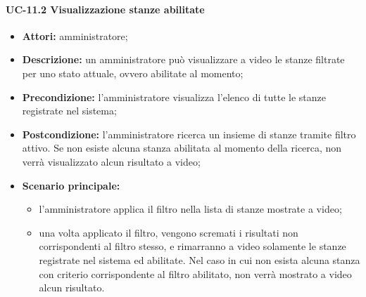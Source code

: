 \paragraph{UC-11.2 Visualizzazione stanze abilitate}
\begin{itemize}
    \item \textbf{Attori:} amministratore;
    \item \textbf{Descrizione:} un amministratore pu\`{o} visualizzare a video le stanze filtrate per uno stato attuale, ovvero abilitate al momento;
    \item \textbf{Precondizione:} l'amministratore visualizza l'elenco di tutte le stanze registrate nel sistema;
    \item \textbf{Postcondizione:} l'amministratore ricerca un insieme di stanze tramite filtro attivo. Se non esiste alcuna stanza abilitata al momento della ricerca, non verrà visualizzato alcun risultato a video;
    \item \textbf{Scenario principale:}
    \begin{itemize}
        \item l'amministratore applica il filtro nella lista di stanze mostrate a video;
        \item una volta applicato il filtro, vengono scremati i risultati non corrispondenti al filtro stesso, e rimarranno a video solamente le stanze registrate nel sistema ed abilitate. Nel caso in cui non esista alcuna stanza con criterio corrispondente al filtro abilitato, non verrà mostrato a video alcun risultato.
    \end{itemize}
\end{itemize}


